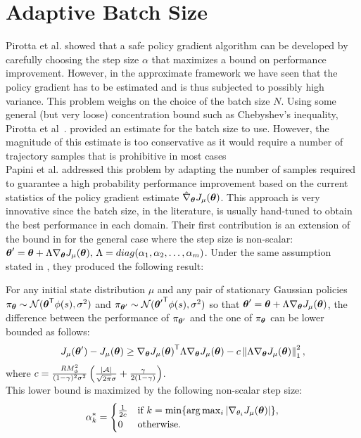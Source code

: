 \section{Adaptive Batch Size}
\label{sec:abs}
Pirotta et al. showed that a safe policy gradient algorithm can be developed by carefully choosing the step size $\alpha$ that maximizes a bound on performance improvement. However, in the approximate framework we have seen that the policy gradient has to be estimated and is thus subjected to possibly high variance. This problem weighs on the choice of the batch size $N$. Using some general (but very loose) concentration bound such as Chebyshev's inequality, Pirotta et al~\cite{adaptive_step}. provided an estimate for the batch size to use. However, the magnitude of this estimate is too conservative as it would require a number of trajectory samples that is prohibitive in most cases\\
Papini et al. \cite{adaptive_batch} addressed this problem by adapting the number of samples required to guarantee a high probability performance improvement based on the current statistics of the policy gradient estimate $\estgradj$. This approach is very innovative since the batch size, in the literature, is usually hand-tuned to obtain the best performance in each domain. Their first contribution is an extension of the bound in  for the general case where the step size is non-scalar: $\vtheta' = \vtheta + \Lambda \gradj,\, \Lambda=diag(\alpha_1, \alpha_2,\ldots,\alpha_m)$. Under the same assumption stated in , they produced the following result:
\begin{theorem}
For any initial state distribution $\mu$ and any pair of stationary Gaussian policies $\pi_{\vtheta}\sim\mathcal{N}(\transpose{\vtheta}\phi(s),\sigma^2)$ and $\pi_{\vtheta'}\sim\mathcal{N}(\transpose{\vtheta'}\phi(s),\sigma^2)$ so that $\vtheta' = \vtheta + \Lambda\gradj$, the difference between the performance of $\pi_{\vtheta'}$ and the one of $\pi_{\vtheta}$ can be lower bounded as follows:
\[
J_\mu(\vtheta') - J_\mu(\vtheta) \geq \transpose{\gradj}\Lambda\gradj - c\norm[1]{\Lambda\gradj}^2,
\]
where $c=\frac{RM_\phi^2}{(1-\gamma)^2\sigma^2}\left(\frac{|\aspace|}{\sqrt{2\pi}\sigma} + \frac{\gamma}{2(1-\gamma)}\right)$.\\
This lower bound is maximized by the following non-scalar step size:
\[
\alpha_k^* = \begin{cases} \frac{1}{2c} & \textrm{if }k=\min\{\arg\max_i|\nabla_{\theta_i} J_\mu(\vtheta)|\}, \\ 0 & \textrm{otherwise}.\end{cases}
\]
\end{theorem}

